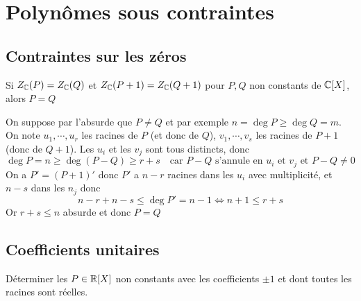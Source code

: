 \section{Polynômes sous contraintes}

\subsection{Contraintes sur les zéros}

\begin{exo}
    Si $Z_{\mathbb C}(P)=Z_{\mathbb C}(Q)$ et $Z_{\mathbb C}(P+1)=Z_{\mathbb C}(Q+1)$ pour $P,Q$ non constants de $\mathbb C[X]$, alors $P=Q$
\end{exo}

On suppose par l'absurde que $P\neq Q$ et par exemple $n=\deg P\geq \deg Q=m$. On note $u_1, \cdots, u_r$ les racines de $P$ (et donc de $Q$), $v_1, \cdots, v_s$ les racines de $P+1$ (donc de $Q+1$). Les $u_i$ et les $v_j$ sont tous distincts, donc \[
    \deg P=n\geq \deg(P-Q)\geq r+s \quad\text{car }P-Q\text{ s'annule en $u_i$ et $v_j$ et }P-Q\neq 0
\]
On a $P'=(P+1)'$ donc $P'$ a $n-r$ racines dans les $u_i$ avec multiplicité, et $n-s$ dans les $n_j$ donc \[
    n-r+n-s\leq \deg P'=n-1\iff n+1\leq r + s
\]
Or $r+s\leq n$ absurde et donc $P = Q$

\subsection{Coefficients unitaires}

\begin{exo}
    Déterminer les $P\in\mathbb R[X]$ non constants avec les coefficients $\pm1$ et dont toutes les racines sont réelles.
\end{exo}

